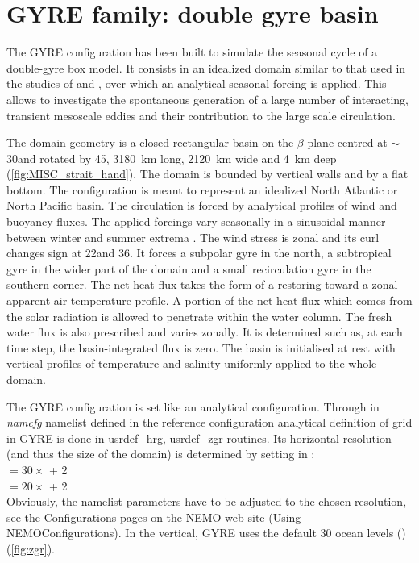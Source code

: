 \documentclass[../tex_main/NEMO_manual]{subfiles}
\begin{document}
\section{GYRE family: double gyre basin }
\label{sec:CFG_gyre}

The GYRE configuration \citep{Levy_al_OM10} has been built to
simulate the seasonal cycle of a double-gyre box model.
It consists in an idealized domain similar to that used in the studies of \citet{Drijfhout_JPO94} and
\citet{Hazeleger_Drijfhout_JPO98, Hazeleger_Drijfhout_JPO99, Hazeleger_Drijfhout_JGR00, Hazeleger_Drijfhout_JPO00},
over which an analytical seasonal forcing is applied.
This allows to investigate the spontaneous generation of a large number of interacting, transient mesoscale eddies 
and their contribution to the large scale circulation. 

The domain geometry is a closed rectangular basin on the $\beta$-plane centred at $\sim$ 30\degN and
rotated by 45\deg, 3180~km long, 2120~km wide and 4~km deep (\autoref{fig:MISC_strait_hand}).
The domain is bounded by vertical walls and by a flat bottom.
The configuration is meant to represent an idealized North Atlantic or North Pacific basin.
The circulation is forced by analytical profiles of wind and buoyancy fluxes.
The applied forcings vary seasonally in a sinusoidal manner between winter and summer extrema \citep{Levy_al_OM10}. 
The wind stress is zonal and its curl changes sign at 22\degN and 36\degN.
It forces a subpolar gyre in the north, a subtropical gyre in the wider part of the domain and
a small recirculation gyre in the southern corner.
The net heat flux takes the form of a restoring toward a zonal apparent air temperature profile.
A portion of the net heat flux which comes from the solar radiation is allowed to penetrate within the water column.
The fresh water flux is also prescribed and varies zonally.
It is determined such as, at each time step, the basin-integrated flux is zero.
The basin is initialised at rest with vertical profiles of temperature and salinity uniformly applied to
the whole domain.

The GYRE configuration is set like an analytical configuration.
Through  in \textit{namcfg} namelist defined in
the reference configuration 
analytical definition of grid in GYRE is done in usrdef\_hrg, usrdef\_zgr routines.
Its horizontal resolution (and thus the size of the domain) is determined by
setting  in : \\
 $= 30 \times$  + 2   \\
 $= 20 \times$  + 2   \\
Obviously, the namelist parameters have to be adjusted to the chosen resolution,
see the Configurations pages on the NEMO web site (Using NEMO\/Configurations).
In the vertical, GYRE uses the default 30 ocean levels () (\autoref{fig:zgr}).
\end{document}
